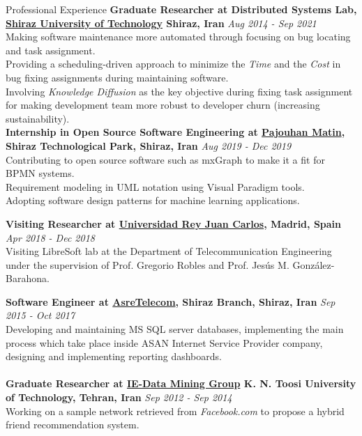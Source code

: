 \documentclass{resume} %
\begin{document}
\begin{rSection}{Professional Experience}
{\bf Graduate Researcher at Distributed Systems Lab, \href{https://sutech.ac.ir/en} {Shiraz University of Technology} Shiraz, Iran} \hfill {\em  Aug 2014 - Sep 2021}\\
Making software maintenance more automated through focusing on bug locating and task assignment.\\
Providing a scheduling-driven approach to minimize the \emph{Time} and the \emph{Cost} in bug fixing assignments during maintaining software.\\
Involving \emph{Knowledge Diffusion} as the key objective during fixing task assignment for making development team more robust to developer churn (increasing sustainability).\\

{\bf Internship in Open Source Software Engineering at \href{https://fstp.ir} {Pajouhan Matin}, Shiraz Technological Park, Shiraz, Iran} \hfill {\em Aug 2019 - Dec 2019}\\
Contributing to open source software such as mxGraph to make it a fit for BPMN systems.
\\Requirement modeling in UML notation using Visual Paradigm tools.
\\Adopting software design patterns for machine learning applications.

{\bf Visiting Researcher at \href{https://urjc.es} {Universidad Rey Juan Carlos}, Madrid, Spain} \hfill {\em Apr 2018 - Dec 2018} 
\\Visiting LibreSoft lab at the Department of Telecommunication Engineering under the supervision of Prof. Gregorio Robles and Prof. Jesús M. González-Barahona.

{\bf Software Engineer at \href{https://asretelecom.net}{AsreTelecom}, Shiraz Branch, Shiraz, Iran} \hfill {\em Sep 2015 - Oct 2017} 
\\  Developing and maintaining MS SQL server databases, implementing the main process which take place inside ASAN Internet Service Provider company, designing and implementing reporting dashboards.\\
\\{\bf Graduate Researcher at \href{https://www.kntu.ac.ir/Index.aspx?lang=2\&sub=73} {IE-Data Mining Group} K. N. Toosi University of Technology, Tehran, Iran} \hfill {\em Sep 2012 - Sep 2014}\\
Working on a sample network retrieved from \emph{Facebook.com} to propose a hybrid friend recommendation system.


\end{rSection}
\end{document}

